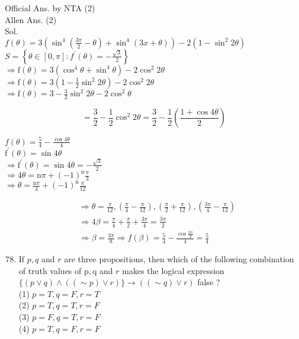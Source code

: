 \documentclass[10pt]{article}
\begin{document}
Official Ans. by NTA (2)\\
Allen Ans. (2)\\
Sol.\\
\(f(\theta)=3\left(\sin ^{4}\left(\frac{3 \pi}{2}-\theta\right)+\sin ^{4}(3 x+\theta)\right)-2\left(1-\sin ^{2} 2 \theta\right)\)\\
\(S=\left\{\theta \in[0, \pi]: f^{\prime}(\theta)=-\frac{\sqrt{3}}{2}\right\}\)\\
\(\Rightarrow \mathrm{f}(\theta)=3\left(\cos ^{4} \theta+\sin ^{4} \theta\right)-2 \cos ^{2} 2 \theta\)\\
\(\Rightarrow \mathrm{f}(\theta)=3\left(1-\frac{1}{2} \sin ^{2} 2 \theta\right)-2 \cos ^{2} 2 \theta\)\\
\(\Rightarrow \mathrm{f}(\theta)=3-\frac{3}{2} \sin ^{2} 2 \theta-2 \cos ^{2} \theta\)

\[
=\frac{3}{2}-\frac{1}{2} \cos ^{2} 2 \theta=\frac{3}{2}-\frac{1}{2}\left(\frac{1+\cos 4 \theta}{2}\right)
\]

\(f(\theta)=\frac{5}{4}-\frac{\cos 4 \theta}{4}\)\\
\(\mathrm{f}^{\prime}(\theta)=\sin 4 \theta\)\\
\(\Rightarrow \mathrm{f}^{\prime}(\theta)=\sin 4 \theta=-\frac{\sqrt{3}}{2}\)\\
\(\Rightarrow 4 \theta=\mathrm{n} \pi+(-1)^{\mathrm{n}} \frac{\pi}{3}\)\\
\(\Rightarrow \theta=\frac{\mathrm{n} \pi}{4}+(-1)^{\mathrm{n}} \frac{\pi}{12}\)

\[
\begin{aligned}
& \Rightarrow \theta=\frac{\pi}{12},\left(\frac{\pi}{4}-\frac{\pi}{12}\right),\left(\frac{\pi}{2}+\frac{\pi}{12}\right),\left(\frac{3 \pi}{4}-\frac{\pi}{12}\right) \\
& \Rightarrow 4 \beta=\frac{\pi}{4}+\frac{\pi}{2}+\frac{3 \pi}{4}=\frac{3 \pi}{2} \\
& \Rightarrow \beta=\frac{3 \pi}{8} \Rightarrow f(\beta)=\frac{5}{4}-\frac{\cos \frac{3 \pi}{2}}{4}=\frac{5}{4}
\end{aligned}
\]

\begin{enumerate}
  \setcounter{enumi}{77}
  \item If \(p, q\) and \(r\) are three propositions, then which of the following combination of truth values of \(\mathrm{p}, \mathrm{q}\) and \(r\) makes the logical expression \(\{(p \vee q) \wedge((\sim p) \vee r)\} \rightarrow((\sim q) \vee r)\) false ?\\
(1) \(p=T, q=F, r=T\)\\
(2) \(p=T, q=T, r=F\)\\
(3) \(p=F, q=T, r=F\)\\
(4) \(p=T, q=F, r=F\)
\end{enumerate}
\end{document}
